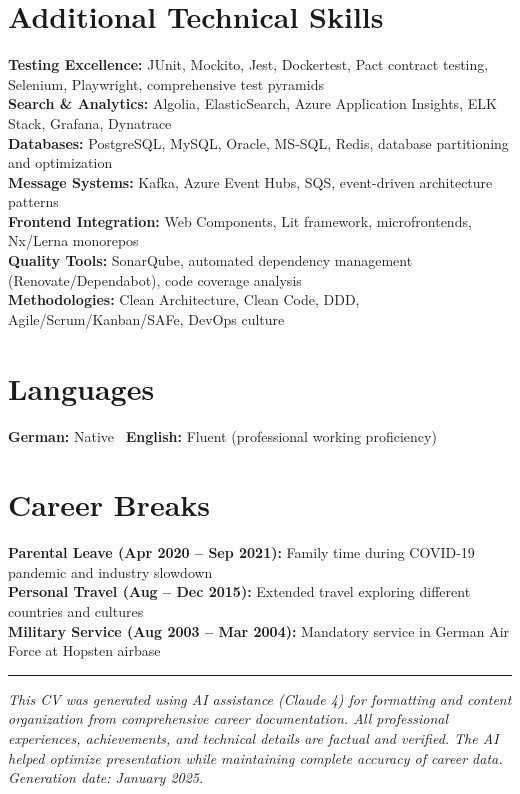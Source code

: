 \documentclass[10pt,a4paper]{article}
\begin{document}
\section{Additional Technical Skills}

\textbf{Testing Excellence:} JUnit, Mockito, Jest, Dockertest, Pact contract testing, Selenium, Playwright, comprehensive test pyramids\\
\textbf{Search \& Analytics:} Algolia, ElasticSearch, Azure Application Insights, ELK Stack, Grafana, Dynatrace\\
\textbf{Databases:} PostgreSQL, MySQL, Oracle, MS-SQL, Redis, database partitioning and optimization\\
\textbf{Message Systems:} Kafka, Azure Event Hubs, SQS, event-driven architecture patterns\\
\textbf{Frontend Integration:} Web Components, Lit framework, microfrontends, Nx/Lerna monorepos\\
\textbf{Quality Tools:} SonarQube, automated dependency management (Renovate/Dependabot), code coverage analysis\\
\textbf{Methodologies:} Clean Architecture, Clean Code, DDD, Agile/Scrum/Kanban/SAFe, DevOps culture

\section{Languages}

\textbf{German:} Native \textbar\ \textbf{English:} Fluent (professional working proficiency)

\section{Career Breaks}

\textbf{Parental Leave (Apr 2020 -- Sep 2021):} Family time during COVID-19 pandemic and industry slowdown\\
\textbf{Personal Travel (Aug -- Dec 2015):} Extended travel exploring different countries and cultures\\
\textbf{Military Service (Aug 2003 -- Mar 2004):} Mandatory service in German Air Force at Hopsten airbase

\vspace{8pt}
\hrule
\vspace{4pt}
{\footnotesize\textit{This CV was generated using AI assistance (Claude 4) for formatting and content organization from comprehensive career documentation. All professional experiences, achievements, and technical details are factual and verified. The AI helped optimize presentation while maintaining complete accuracy of career data. Generation date: January 2025.}}
\end{document}
